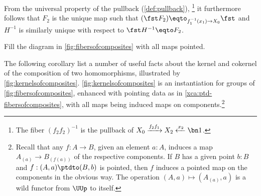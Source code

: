 From the universal property of the pullback (\cref{def:pullback}),%
\footnote{The fiber $(f_2f_2)^{-1}$ is the pullback of
$X_0\xrightarrow{f_2f_1} X_2 \xleftarrow{x_2}\bn1$.}
it furthermore follows that $F_2$ is the unique map such 
that $(\fst F_2)\eqto _{f_1^{-1}(x_1)\to X_0}\fst$ and $H^{-1}$ is 
similarly unique with respect to $\fst H^{-1}\eqto F_2$.

\begin{xca}\label{xca:ptd-fibersofcomposites}
Fill the diagram in \cref{fig:fibersofcomposites}
with all maps pointed.
\end{xca}

The following corollary list a number of useful facts about the
kernel and cokernel of the composition of two homomorphisms, 
illustrated by \cref{fig:kernelsofcomposites}.
\cref{fig:kernelsofcomposites} is an instantiation for groups of
\cref{fig:fibersofcomposites}, enhanced with pointing data
as in \cref{xca:ptd-fibersofcomposites}, with all maps being induced
maps on components.\footnote{\label{ft:cmpnt:UUp->UUp}
Recall that any $f:A\to B$,
given an element $a:A$, induces a map $A_{(a)} \to B_{(f(a))}$ of the
respective components. If $B$ has a given point $b:B$ and 
$f:(A,a)\ptdto(B,b)$ is pointed, then $f$ induces a pointed map on 
the components in the obvious way. 
The operation $(A,a) \mapsto (A_{(a)},a)$ is a wild functor from
$\UUp$ to itself.}

